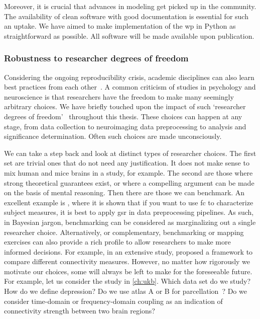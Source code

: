 Moreover, it is crucial that advances in modeling get picked up in the community.
The availability of clean software with good documentation is essential for such an uptake.
We have aimed to make implementation of the \gls{wp} in Python as straightforward as possible.
All software will be made available upon publication.

\subsubsection{Robustness to researcher degrees of freedom}\label{subsec:robustness}

Considering the ongoing reproducibility crisis, academic disciplines can also learn best practices from each other~\parencite{Bell2021}.
A common criticism of studies in psychology and neuroscience is that researchers have the freedom to make many seemingly arbitrary choices.
We have briefly touched upon the impact of such `researcher degrees of freedom'~\parencite{Gelman2013} throughout this thesis.
These choices can happen at any stage, from data collection to neuroimaging data preprocessing to analysis and significance determination.
Often such choices are made unconsciously.

We can take a step back and look at distinct types of researcher choices.
%
The first set are trivial ones that do not need any justification.
It does not make sense to mix human and mice brains in a study, for example.
The second are those where strong theoretical guarantees exist, or where a compelling argument can be made on the basis of mental reasoning.
%
Then there are those we can benchmark.
An excellent example is \textcite{Li2019a}, where it is shown that if you want to use \gls{fc} to characterize subject measures, it is best to apply \gls{gsr} in data preprocessing pipelines.
As such, in Bayesian jargon, benchmarking can be considered as marginalizing out a single researcher choice.
Alternatively, or complementary, benchmarking or mapping exercises can also provide a rich profile to allow researchers to make more informed decisions.
For example, in an extensive study, \textcite{Wang2014} proposed a framework to compare different connectivity measures.
%
However, no matter how rigorously we motivate our choices, some will always be left to make for the foreseeable future.
For example, let us consider the study in \cref{ch:ukb}.
Which data set do we study?
How do we define depression?
Do we use atlas A or B for parcellation~\parencite[see also][]{Dadashkarimi2021}?
Do we consider time-domain or frequency-domain coupling as an indication of connectivity strength between two brain regions?

